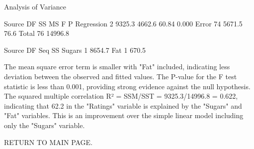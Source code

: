 Analysis of Variance

Source       DF          SS          MS         F        P
Regression    2      9325.3      4662.6     60.84    0.000
Error        74      5671.5        76.6
Total        76     14996.8

Source       DF      Seq SS
Sugars        1      8654.7
Fat           1       670.5

The mean square error term is smaller with "Fat" included, indicating less deviation between
the observed and fitted values.  The P-value for the F test statistic is less than
0.001, providing strong evidence against the null hypothesis.  The squared multiple correlation
R² = SSM/SST = 9325.3/14996.8 = 0.622, indicating that 62.2%
in the "Ratings" variable is explained by the "Sugars" and "Fat" variables.  This is an improvement
over the simple linear model including only the "Sugars" variable. 

RETURN TO MAIN PAGE.


 
